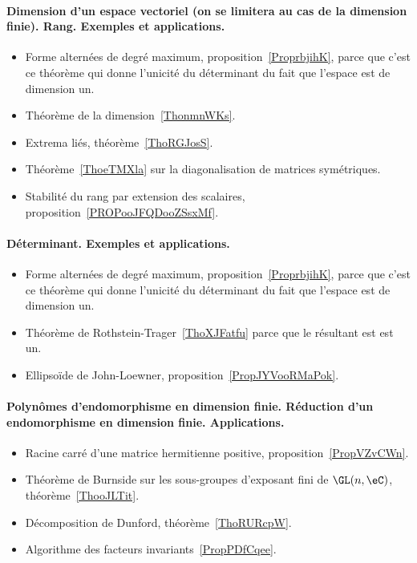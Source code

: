 \paragraph{Dimension d'un espace vectoriel (on se limitera au cas de la dimension finie). Rang. Exemples et applications.}
\begin{itemize}
    \item Forme alternées de degré maximum, proposition~\ref{ProprbjihK}, parce que c'est ce théorème qui donne l'unicité du déterminant du fait que l'espace est de dimension un.
    \item Théorème de la dimension~\ref{ThonmnWKs}.
    \item Extrema liés, théorème~\ref{ThoRGJosS}.
    \item Théorème~\ref{ThoeTMXla} sur la diagonalisation de matrices symétriques.
    \item Stabilité du rang par extension des scalaires, proposition~\ref{PROPooJFQDooZSsxMf}.
\end{itemize}
\paragraph{Déterminant. Exemples et applications.}
\begin{itemize}
    \item Forme alternées de degré maximum, proposition~\ref{ProprbjihK}, parce que c'est ce théorème qui donne l'unicité du déterminant du fait que l'espace est de dimension un.
    \item Théorème de Rothstein-Trager~\ref{ThoXJFatfu} parce que le résultant est est un.
    \item Ellipsoïde de John-Loewner, proposition~\ref{PropJYVooRMaPok}.
\end{itemize}
\paragraph{Polynômes d’endomorphisme en dimension finie. Réduction d’un endomorphisme en dimension finie. Applications.}
\begin{itemize}
    \item Racine carré d'une matrice hermitienne positive, proposition~\ref{PropVZvCWn}.
    \item Théorème de Burnside sur les sous-groupes d'exposant fini de \( \GL(n,\eC)\), théorème~\ref{ThooJLTit}.
    \item Décomposition de Dunford, théorème~\ref{ThoRURcpW}.
    \item Algorithme des facteurs invariants~\ref{PropPDfCqee}.
\end{itemize}
